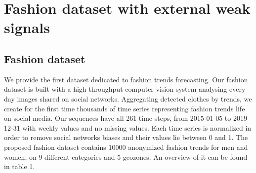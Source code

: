 \documentclass{article} %
\newcommand{\numberts}{10000}
\begin{document}
\section{Fashion dataset with external weak signals}
\label{sec:dataset}


\subsection{Fashion dataset}

We provide the first dataset dedicated to fashion trends forecasting. Our fashion dataset is built with a high throughput computer vision system analysing every day images shared on social networks. Aggregating detected clothes by trends, we create for the first time thousands of time series representing fashion trends life on social media. Our sequences have all 261 time steps, from 2015-01-05 to 2019-12-31 with weekly values and no missing values. Each time series is normalized in order to remove social networks biases and their values lie between 0 and 1. The proposed fashion dataset contains $\numberts$ anonymized fashion trends for men and women, on 9 different categories and 5 geozones. An overview of it can be found in table 1.
\end{document}
